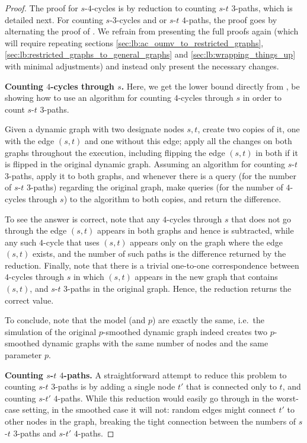 \documentclass[letter,11pt]{article}
\newcommand{\st}{$s$-$t$\xspace}
\newcommand{\paths}[3]{${#1}$-${#2}$ ${#3}$-paths\xspace}
\begin{document}
\begin{proof}
The proof for $s$-$4$-cycles is by reduction to counting \paths{s}{t}{3}, which is detailed next.
For counting $s$-$3$-cycles and or \paths{s}{t}{4},
the proof goes by alternating the proof of .
We refrain from presenting the full proofs again (which will require repeating
sections 
\ref{sec:lb:ac_oumv_to_restricted_graphs}, \ref{sec:lb:restricted_graphs_to_general_graphs} and
\ref {sec:lb:wrapping_things_up} with minimal adjustments)
and instead only present the necessary  changes.

\noindent\textbf{Counting $4$-cycles through $s$.}
Here, we get the lower bound directly from ,
be showing how to use an algorithm for counting 
$4$-cycles through $s$
in order to count \st 3-paths.

Given a dynamic graph with two designate nodes $s,t$,
create two copies of it, one with the edge $(s,t)$ and one without this edge;
apply all the changes on both graphs throughout the execution, including flipping the edge $(s,t)$ in both if it is flipped in the original dynamic graph.
Assuming an algorithm for counting \st 3-paths, 
apply it to both graphs, 
and whenever there is a query (for the number of \st 3-paths) regarding the original graph,
make queries 
(for the number of $4$-cycles through $s$) 
to the algorithm to both copies, and return the difference.

To see the answer is correct, note that any $4$-cycles through $s$ that does not go through the edge $(s,t)$ appears in both graphs and hence is subtracted, 
while any such $4$-cycle that uses $(s,t)$ appears only on the graph where the edge $(s,t)$ exists, and the number of such paths is the difference returned by the reduction.
Finally, note that there is a trivial one-to-one correspondence between $4$-cycles through $s$  in which $(s,t)$ appears in the new graph that contains $(s,t)$, and 
\st 3-paths in the original graph.
Hence, the reduction returns the correct value.

To conclude, note that the model (and $p$) are exactly the same, 
i.e.\ the simulation of the original $p$-smoothed dynamic graph 
indeed creates two 
$p$-smoothed dynamic graphs with the same number of nodes and the same parameter $p$.

\noindent\textbf{Counting \paths{s}{t}{4}.}
A straightforward attempt to reduce this problem to counting 
\st 3-paths is by adding a single node $t'$ that is connected only to $t$,
and counting \paths{s}{t'}{4}. 
While this reduction would easily go through in the worst-case setting, in the smoothed case it will not: random edges might connect $t'$ to other nodes in the graph, breaking the tight connection between the numbers of \paths{s}{t}{3} and \paths{s}{t'}{4}.


\end{proof}
\end{document}
